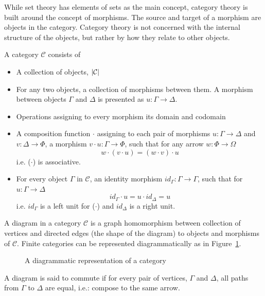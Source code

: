 While set theory has elements of sets as the main concept, category theory is built around the concept of morphisms. The source and target of a morphism are objects in the category. Category theory is not concerned with the internal structure of the objects, but rather by how they relate to other objects. 

A category $\mathcal{C}$ consists of 
\begin{itemize}
\item A collection of objects, $| \mathcal{C} |$
\item For any two objects, a collection of morphisms between them. A morphism between objects $\Gamma$ and $\Delta$ is presented as $u : \Gamma \to \Delta$.  
\item Operations assigning to every morphism its domain and codomain 
\item A composition function $\cdot$ assigning to each pair of morphisms  $u : \Gamma \to \Delta$ and $v : \Delta \to \Phi$, a morphism $v \cdot u : \Gamma \to \Phi$, such that for any arrow $w : \Phi \to \Omega$
\[ w \cdot (v \cdot u) = (w \cdot v) \cdot u \]
i.e. ($\cdot$) is associative. 
\item For every object $\Gamma$ in $\mathcal{C}$, an identity morphism $id_\Gamma : \Gamma \to \Gamma$, such that for $u : \Gamma \to \Delta$ 
\[ id_\Gamma \cdot u = u \cdot id_\Delta = u \]
i.e. $id_\Gamma$ is a left unit for ($\cdot$) and $id_\Delta$ is a right unit. 
\end{itemize}

A diagram in a category $\mathcal{C}$ is a graph homomorphism between collection of vertices and directed edges (the shape of the diagram) to objects and morphisms of $\mathcal{C}$. 
Finite categories can be represented diagrammatically as in Figure~\ref{fig:diagram}. 
\begin{figure}
\caption{A diagrammatic representation of a category}
\label{fig:diagram}
\end{figure}
A diagram is said to commute if for every pair of vertices, $\Gamma$ and $\Delta$, all paths from $\Gamma$ to $\Delta$ are equal, i.e.: compose to the same arrow. 

